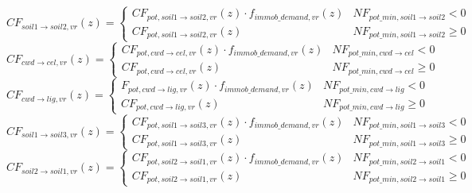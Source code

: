 \begin{equation}
    CF_{soil1 \rightarrow soil2, vr}(z)=\left\{\begin{array}{ll} CF_{pot, soil1 \rightarrow soil2, vr}(z) \cdot f_{immob\_demand, vr}(z) & NF_{pot\_{min, soil1 \rightarrow soil2}} <0 \\ 
    CF_{pot, soil1 \rightarrow soil2, vr}(z) & NF_{pot\_{min, soil1 \rightarrow soil2}} \geq 0
   \end{array}\right.
\end{equation}
\begin{equation}
    CF_{cwd \rightarrow cel, vr}(z)=\left\{\begin{array}{ll} CF_{pot, cwd \rightarrow cel, vr}(z) \cdot f_{immob\_demand, vr}(z) & NF_{pot\_{min, cwd \rightarrow cel}} <0 \\ 
    CF_{pot, cwd \rightarrow cel, vr}(z) & NF_{pot\_{min, cwd \rightarrow cel}} \geq 0
   \end{array}\right.
\end{equation}
\begin{equation}
    CF_{cwd \rightarrow lig, vr}(z)=\left\{\begin{array}{ll} F_{pot, cwd \rightarrow lig, vr}(z) \cdot f_{immob\_demand, vr}(z) & NF_{pot\_{min, cwd \rightarrow lig}} <0 \\ 
    CF_{pot, cwd \rightarrow lig, vr}(z) & NF_{pot\_{min, cwd \rightarrow lig}} \geq 0
   \end{array}\right.
\end{equation}
\begin{equation}
    CF_{soil1 \rightarrow soil3, vr}(z)=\left\{\begin{array}{ll} CF_{pot, soil1 \rightarrow soil3, vr}(z) \cdot f_{immob\_demand, vr}(z) & NF_{pot\_{min, soil1 \rightarrow soil3}} <0 \\ 
    CF_{pot, soil1 \rightarrow soil3, vr}(z) & NF_{pot\_{min, soil1 \rightarrow soil3}} \geq 0
   \end{array}\right.
\end{equation}
\begin{equation}
    CF_{soil2 \rightarrow soil1, vr}(z)=\left\{\begin{array}{ll} CF_{pot, soil2 \rightarrow soil1, vr}(z) \cdot f_{immob\_demand, vr}(z) & NF_{pot\_{min, soil2 \rightarrow soil1}} <0 \\ 
    CF_{pot, soil2 \rightarrow soil1, vr}(z) & NF_{pot\_{min, soil2 \rightarrow soil1}} \geq 0
   \end{array}\right.
\end{equation}
